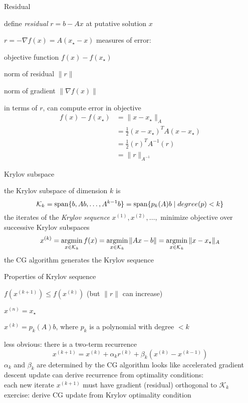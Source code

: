 \documentclass[presentation,xcolor={usenames,dvipsnames}]{beamer}
\begin{document}
\begin{frame}{Residual}

define \emph{residual} $r = b - Ax$ at putative solution $x$
\bit
\item $r = -\nabla f(x) = A(x_\star-x)$
\eit
\pause \vfill
measures of error:
\bit
\item objective function $f(x) - f(x_\star)$
\item norm of residual $\| r \|$
\item norm of gradient $\| \nabla f(x) \|$
\item in terms of $r$, can compute error in objective
\begin{align*}
f(x)-f(x_\star) &= \|x - x_\star\|_A \\
&= \frac 1 2 (x - x_\star)^T A (x - x_\star) \\
&= \frac 1 2 (r)^T A^{-1} (r) \\
&= \|r\|_{A^{-1}}
\end{align*}
\eit

\end{frame}

\begin{frame}{Krylov subspace}

the Krylov subspace of dimension $k$ is
\[
\mathcal K_k = \mbox{\textrm{span}}\{b, Ab, \ldots, A^{k-1} b\} = \mbox{\textrm{span}}\{p_k(A)b \mid \mathop{degree}(p) < k\}
\]
\pause \vfill
the iterates of the \emph{Krylov sequence} $x^{(1)}, x^{(2)}, \ldots,$ minimize objective over successive Krylov subspaces
\[
x^{(k)} = \mathop{\rm argmin}_{x \in \mathcal K_k} f(x) = \mathop{\rm argmin}_{x \in \mathcal K_k} \|Ax - b\| = \mathop{\rm argmin}_{x \in \mathcal K_k} \|x - x_\star\|_A
\]
the CG algorithm generates the Krylov sequence

\end{frame}

\begin{frame}{Properties of Krylov sequence}

\bit
\item $f(x^{(k+1)}) \leq f(x^{(k)})$ (but $\|r\|$ can increase)
\item $x^{(n)} = x_\star$
\item $x^{(k)} = p_k(A)b$, where $p_k$ is a polynomial with degree $< k$
\item less obvious: there is a two-term recurrence
\[
x^{(k+1)} = x^{(k)} + \alpha_k r^{(k)} + \beta_k(x^{(k)} - x^{(k-1)})
\]
\bit
\pitem $\alpha_k$ and $\beta_k$ are determined by the CG algorithm
\pitem looks like accelerated gradient descent update
\pitem can derive recurrence from optimality conditions: \\
each new iterate $x^{(k+1)}$ must have gradient (residual) orthogonal to $\mathcal K_k$
\eit
\eit
\pause
exercise: derive CG update from Krylov optimality condition
\end{frame}
\end{document}
